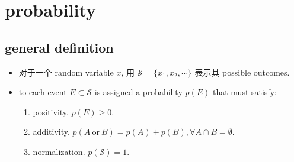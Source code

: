 \chapter{probability}
\section{general definition}
\begin{itemize}
	\item 对于一个 random variable $x$, 用 $\mathcal{S} = \{x_1, x_2, \cdots\}$ 表示其 possible outcomes.
	
	\item to each event $E \subset \mathcal{S}$ is assigned a probability $p(E)$ that must satisfy:
	\begin{enumerate}
		\item positivity. $p(E) \geq 0$.
		
		\item additivity. $p(A \ \text{or} \ B) = p(A) + p(B), \forall A \cap B = \emptyset$.
		
		\item normalization. $p(\mathcal{S}) = 1$.
	\end{enumerate}
\end{itemize}

